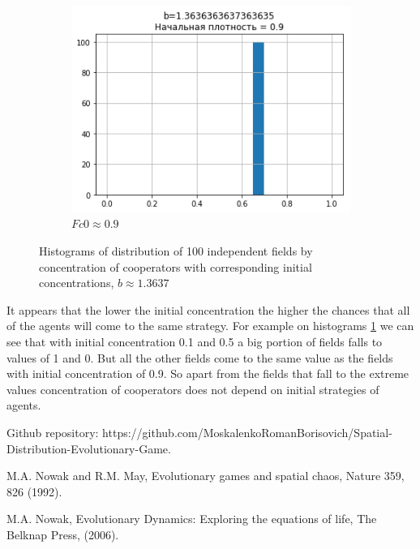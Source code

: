 \documentclass[a4paper,12pt]{article}
\begin{document}
\begin{figure}[h]
\begin{subfigure}[b]{0.48\textwidth}
		\includegraphics[width = \textwidth]{b1,3_Fc0,9_hist.png}
		\caption{$Fc0 \approx 0.9$}
	\end{subfigure}
	
	\caption{Histograms of distribution of 100 independent fields by concentration of cooperators with corresponding initial concentrations, $b\approx 1.3637$}
	\label{fig:Fc0 hist}
\end{figure}

It appears that the lower the initial concentration the higher the chances that all of the agents will come to the same strategy. For example on histograms \ref{fig:Fc0 hist} we can see that with initial concentration 0.1 and 0.5 a big portion of fields falls to values of 1 and 0. But all the other fields come to the same value  as the fields with initial concentration of 0.9. So apart from the fields that fall to the extreme values concentration of cooperators does not depend on initial strategies of agents.


\begin{thebibliography}{9}

Github repository: https://github.com/MoskalenkoRomanBorisovich/Spatial-Distribution-Evolutionary-Game. 

M.A. Nowak and R.M. May, Evolutionary games and spatial chaos, Nature 359, 826 (1992).

M.A. Nowak, Evolutionary Dynamics: Exploring the equations of life, The Belknap Press, (2006).

\end{thebibliography}
\end{document}
